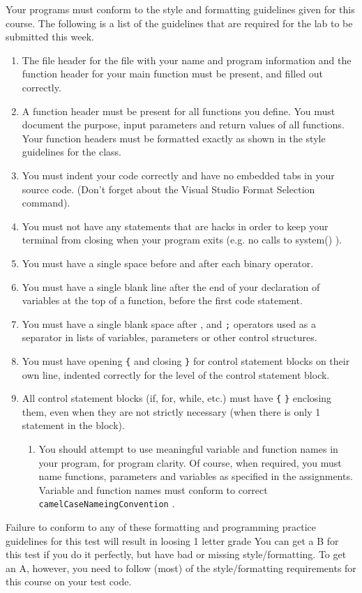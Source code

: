 \documentclass[11pt]{article}
\begin{document}
Your programs must conform to the style and formatting guidelines given for this course.
The following is a list of the guidelines that are required for the lab to be submitted
this week.

\begin{enumerate}
\item The file header for the file with your name and program information
  and the function header for your main function must be present, and
  filled out correctly.
\item A function header must be present for all functions you define.
   You must document the purpose, input parameters and return values
   of all functions.  Your function headers must be formatted exactly
   as shown in the style guidelines for the class.
\item You must indent your code correctly and have no embedded tabs in
  your source code. (Don't forget about the Visual Studio Format
  Selection command).
\item You must not have any statements that are hacks in order to keep
   your terminal from closing when your program exits (e.g. no calls
   to system() ).
\item You must have a single space before and after each binary operator.
\item You must have a single blank line after the end of your declaration
  of variables at the top of a function, before the first code
  statement.
\item You must have a single blank space after , and \verb~;~ operators used as a
  separator in lists of variables, parameters or other control
  structures.
\item You must have opening \verb~{~ and closing \verb~}~ for control statement blocks
  on their own line, indented correctly for the level of the control
  statement block.
\item All control statement blocks (if, for, while, etc.) must have \verb~{~
   \verb~}~ enclosing them, even when they are not strictly necessary
   (when there is only 1 statement in the block).
\begin{enumerate}
\item You should attempt to use meaningful variable and function names in
   your program, for program clarity.  Of course, when required, you
   must name functions, parameters and variables as specified in the
   assignments.  Variable and function names must conform to correct
   \verb~camelCaseNameingConvention~ .
\end{enumerate}
\end{enumerate}

Failure to conform to any of these formatting and programming practice
guidelines for this test will result in loosing 1 letter grade You can
get a B for this test if you do it perfectly, but have bad or missing
style/formatting.  To get an A, however, you need to follow (most) of
the style/formatting requirements for this course on your test code.
\end{document}
